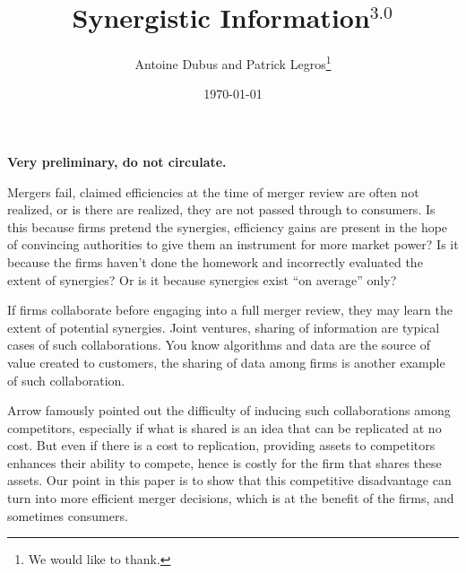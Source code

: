 \documentclass[a4paper,leqno]{article}%
\begin{document}
\title{Synergistic Information$^{3.0}$}
\author{Antoine Dubus and Patrick Legros\thanks{We would like to thank.}}
\date{\today}


\maketitle

 
\textbf{Very preliminary, do not circulate.}

\baselineskip0.7cm
Mergers fail, claimed efficiencies at the time of merger review are often not realized, or is there are realized, they are not passed through to consumers. Is this because firms pretend the synergies, efficiency gains are present in the hope of convincing authorities to give them an instrument for more market power? Is it because the firms haven't done the homework and incorrectly evaluated the extent of synergies? Or is it because synergies exist ``on average'' only?

If firms collaborate before engaging into a full merger review, they may learn the extent of potential synergies. Joint ventures, sharing of information are typical cases of such collaborations. You know algorithms and data are the source of value created to customers, the sharing of data among firms is another example of such collaboration.

Arrow famously pointed out the difficulty of inducing such collaborations among competitors, especially if what is shared is an idea that can be replicated at no cost. But even if there is a cost to replication, providing assets to competitors enhances their ability to compete, hence is costly for the firm that shares these assets. Our point in this paper is to show that this competitive disadvantage can turn into more efficient merger decisions, which is at the benefit of the firms, and sometimes consumers.
\end{document}
